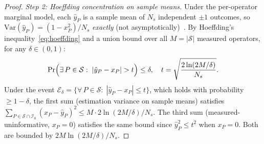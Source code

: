 \documentclass[twocolumn,prx,aps,superscriptaddress,longbibliography,floatfix]{revtex4-2}
\begin{document}
\begin{proof}
\emph{Step 2: Hoeffding concentration on sample means.}
Under the per-operator marginal model, each $\hat{y}_P$ is
a sample mean of $N_s$ independent $\pm 1$ outcomes, so
$\mathrm{Var}(\hat{y}_P) = (1 - x_P^2)/N_s$ \emph{exactly}
(not asymptotically)~\cite{Helstrom1976,Holevo2011,GillMassar2000}.
By Hoeffding's inequality~\eqref{eq:hoeffding} and a union
bound over all $M = |\mathcal{S}|$ measured operators, for any
$\delta \in (0,1)$:
\begin{equation}\label{eq:variance-bound}
  \Pr\Bigl(\exists\, P \in \mathcal{S}:\;
  |\hat{y}_P - x_P| > t \Bigr) \le \delta,
  \quad t = \sqrt{\frac{2\ln(2M/\delta)}{N_s}}.
\end{equation}
Under the event $\mathcal{E}_\delta = \{\forall\, P \in \mathcal{S}:\;
|\hat{y}_P - x_P| \le t\}$, which holds with probability
$\ge 1 - \delta$, the first sum (estimation variance on
sample means) satisfies
$\sum_{P \in \mathcal{S} \cap \mathcal{I}_0}
(x_P - \hat{y}_P)^2 \le M \cdot 2\ln(2M/\delta)/N_s$.
The third sum (measured-uninformative, $x_P = 0$) satisfies
the same bound since $\hat{y}_P^2 \le t^2$ when $x_P = 0$.
Both are bounded by $2M\ln(2M/\delta)/N_s$.


\end{proof}
\end{document}
